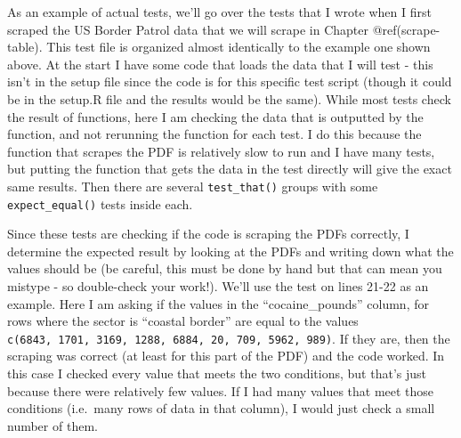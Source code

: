 \documentclass[
  a4paper,
]{krantz}
\begin{document}
As an example of actual tests, we'll go over the tests that
I wrote when I first scraped the US Border Patrol data that
we will scrape in Chapter @ref(scrape-table). This test file
is organized almost identically to the example one shown
above. At the start I have some code that loads the data
that I will test - this isn't in the setup file since the
code is for this specific test script (though it could be in
the setup.R file and the results would be the same). While
most tests check the result of functions, here I am checking
the data that is outputted by the function, and not
rerunning the function for each test. I do this because the
function that scrapes the PDF is relatively slow to run and
I have many tests, but putting the function that gets the
data in the test directly will give the exact same results.
Then there are several \texttt{test\_that()} groups with
some \texttt{expect\_equal()} tests inside each.

Since these tests are checking if the code is scraping the
PDFs correctly, I determine the expected result by looking
at the PDFs and writing down what the values should be (be
careful, this must be done by hand but that can mean you
mistype - so double-check your work!). We'll use the test on
lines 21-22 as an example. Here I am asking if the values in
the ``cocaine\_pounds'' column, for rows where the sector is
``coastal border'' are equal to the values
\texttt{c(6843,\ 1701,\ 3169,\ 1288,\ 6884,\ 20,\ 709,\ 5962,\ 989)}.
If they are, then the scraping was correct (at least for
this part of the PDF) and the code worked. In this case I
checked every value that meets the two conditions, but
that's just because there were relatively few values. If I
had many values that meet those conditions (i.e.~many rows
of data in that column), I would just check a small number
of them.
\end{document}
